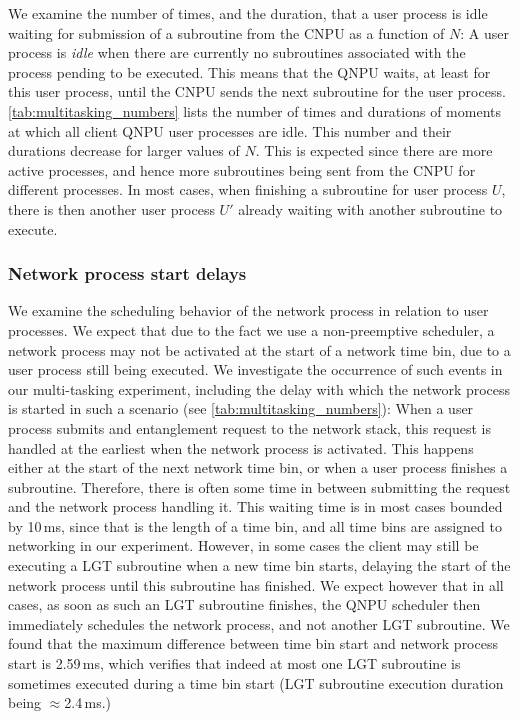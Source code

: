 We examine the number of times, and the duration, that a user process is idle waiting for submission of a subroutine from the \ac{CNPU} as a function of $N$: A user process is \textit{idle} when there are currently no subroutines associated with the process pending to be executed. This means that the \ac{QNPU} waits, at least for this user process, until the \ac{CNPU} sends the next subroutine for the user process. \cref{tab:multitasking_numbers} lists the number of times and durations of moments at which all client \ac{QNPU} user processes are idle. This number and their durations decrease for larger values of $N$. This is expected since there are more active processes, and hence more subroutines being sent from the \ac{CNPU} for different processes. In most cases, when finishing a subroutine for user process $U$, there is then another user process $U'$ already waiting with another subroutine to execute.

\subsubsection{Network process start delays}

We examine the scheduling behavior of the network process in relation to user processes. We expect that due to the fact we use a non-preemptive scheduler, a network process may not be activated at the start of a network time bin, due to a user process still being executed. We investigate the occurrence of such events in our multi-tasking experiment, including the delay with which the network process is started in such a scenario (see \cref{tab:multitasking_numbers}): When a user process submits and entanglement request to the network stack, this request is handled at the earliest when the network process is activated. This happens either at the start of the next network time bin, or when a user process finishes a subroutine. Therefore, there is often some time in between submitting the request and the network process handling it. This waiting time is in most cases bounded by 10\,ms, since that is the length of a time bin, and all time bins are assigned to networking in our experiment. However, in some cases the client may still be executing a \ac{LGT} subroutine when a new time bin starts, delaying the start of the network process until this subroutine has finished. We expect however that in all cases, as soon as such an \ac{LGT} subroutine finishes, the \ac{QNPU} scheduler then immediately schedules the network process, and not another \ac{LGT} subroutine. We found that the maximum difference between time bin start and network process start is 2.59\,ms, which verifies that indeed at most one \ac{LGT} subroutine is sometimes executed during a time bin start (\ac{LGT} subroutine execution duration being $\approx$2.4\,ms.)

